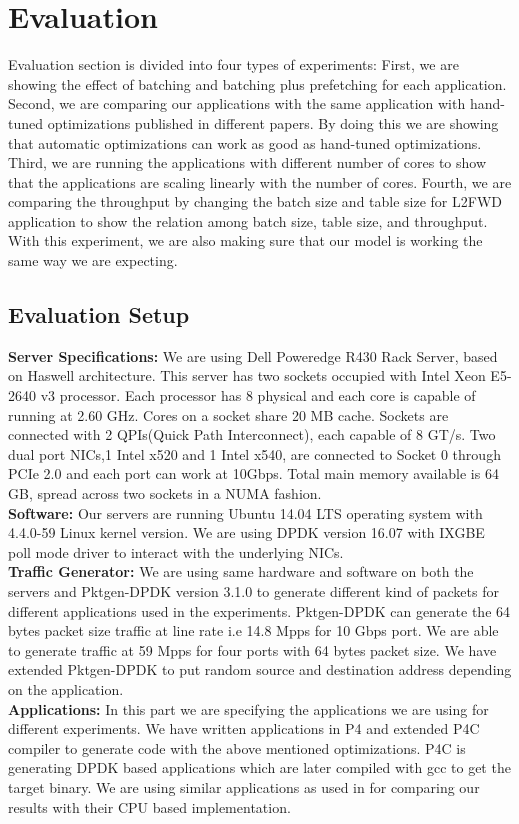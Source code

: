 \section{Evaluation}
\label{evaluation}
Evaluation section is divided into four types of experiments: First, we are showing the effect of batching and batching plus prefetching for each application. Second, we are comparing our applications with the same application with hand-tuned optimizations published in different papers. By doing this we are showing that automatic optimizations can work as good as hand-tuned optimizations. Third, we are running the applications with different number of cores to show that the applications are scaling linearly with the number of cores. Fourth, we are comparing the throughput by changing the batch size and table size for L2FWD application to show the relation among batch size, table size, and throughput. With this experiment, we are also making sure that our model is working the same way we are expecting.

\subsection{Evaluation Setup}
\textbf{Server Specifications:} We are using Dell Poweredge R430 Rack Server, based on Haswell architecture. This server has two sockets occupied with Intel Xeon E5-2640 
v3\cite{xeon} processor. Each processor has 8 physical and each core is capable of running at 2.60 GHz. Cores on a socket share 20 MB cache. Sockets are connected with 2 QPIs(Quick Path Interconnect), each capable of 8 GT/s. Two dual port NICs,1 Intel x520 and 1 Intel x540, are connected to Socket 0 through PCIe 2.0 and each port can work at 10Gbps. Total main memory available is 64 GB, spread across two sockets in a NUMA fashion.
\\
\textbf{Software:} Our servers are running Ubuntu 14.04 LTS operating system with 4.4.0-59 Linux kernel version. We are using DPDK version 16.07 with IXGBE poll mode driver to
interact with the underlying NICs. 
\\
\textbf{Traffic Generator:} We are using same hardware and software on both the servers and Pktgen-DPDK\cite{pktgen} version 3.1.0 to generate different kind of packets for different applications used in the experiments. Pktgen-DPDK\cite{pktgen} can generate the 64 bytes packet size traffic at line rate i.e 14.8 Mpps for 10 Gbps port. We are able to generate traffic at 59 Mpps for four ports with 64 bytes packet size. We have extended Pktgen-DPDK\cite{pktgen} to put random source and destination address depending on the application.
\\
\textbf{Applications:} In this part we are specifying the applications we are using for different experiments. We have written applications in P4\cite{Bosshart:2014:PPP:2656877.2656890} and extended P4C\cite{Laki:2016:HSP:2934872.2959080} compiler to generate code with the above mentioned optimizations. P4C\cite{Laki:2016:HSP:2934872.2959080} is generating DPDK\cite{DPDK} based applications which are later compiled with gcc to get the target binary. We are using similar applications as used in \cite{189006} for comparing our results with their CPU based implementation.

